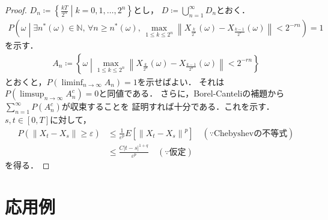 \documentclass[dvipdfmx,autodetect-engine]{jsarticle}
\theoremstyle{remark}
\theoremstyle{definition}
\newcommand{\N}{\mathbb{N}}
\newcommand{\abs}[1]{\left\lvert#1\right\rvert}
\newcommand{\norm}[1]{\left\lVert#1\right\rVert}
\newcommand{\setmid}{\mathrel{} \middle| \mathrel{}}
\begin{document}
\begin{proof}
    $D_{n} \coloneqq \left\{\frac{kT}{2^n} \setmid k=0,1,\ldots,2^{n}\right\}$とし，
    $D \coloneqq \bigcup_{n=1}^{\infty} D_n$とおく．
    \begin{align}
        P\left(\omega \setmid 
        \exists n^{*}(\omega)\in \N,\,\forall n \geq n^{*}(\omega),\,
        \max_{1\leq k\leq 2^{n}} \norm{X_{\frac{k}{2^n}}(\omega) - X_{\frac{k-1}{2^n}}(\omega)}
        < 2^{-rn}\right) = 1
    \end{align}
    を示す．
    \begin{align}
        A_{n} \coloneqq \left\{ \omega \setmid 
        \max_{1\leq k\leq 2^n} \norm{X_{\frac{k}{2^n}}(\omega) - 
        X_{\frac{k-1}{2^n}}(\omega)} < 2^{-rn}\right\}
    \end{align}
    とおくと，$P(\liminf_{n\to\infty} A_{n})=1$を示せばよい．
    それは$P(\limsup_{n\to\infty}A_{n}^{c})=0$と同値である．
    さらに，Borel-Canteliの補題から$\sum_{n=1}^{\infty}P(A_{n}^{c})$が収束することを
    証明すれば十分である．これを示す．
    $s,t \in [0,T]$に対して，
    \begin{align}
        P(\norm{X_{t} - X_{s}} \geq \varepsilon) 
        &\leq \frac{1}{\varepsilon^{p}} E[\norm{X_{t} - X_{s}}^{p}] 
        \quad (\because \text{Chebyshevの不等式})\\
        &\leq  \frac{C\abs{t-s}^{1+q}}{\varepsilon^{p}} \quad (\because \text{仮定})
    \end{align}
    を得る．
\end{proof}

\section{応用例}
\end{document}
